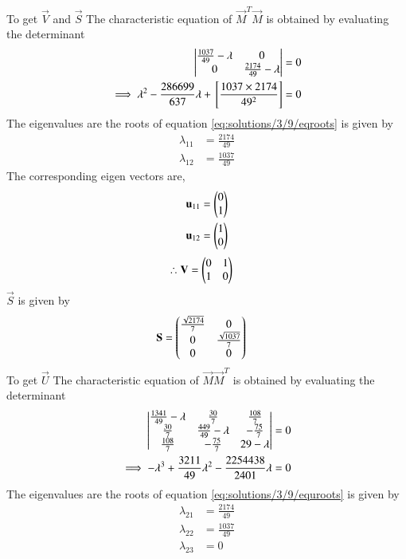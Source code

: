 {To get $\vec{V}$ and $\vec{S}$ }
The characteristic equation of $\vec{M}^T\vec{M}$ is obtained by evaluating the determinant 
\begin{align}
    \begin{vmatrix} \frac{1037}{49} - \lambda & 0\\ 0 & \frac{2174}{49} - \lambda\end{vmatrix} &= 0\\
	\implies \lambda^2 - \frac{286699}{637}\lambda + {}\left[\frac{1037 \times 2174}{49^2}\right] &=0\label{eq:solutions/3/9/eqroots}
\end{align}
The eigenvalues are the roots of equation \ref{eq:solutions/3/9/eqroots} is given by 
\begin{align}
	\lambda_{11}&= \frac{2174}{49} \label{eq:solutions/3/9/eqeig1}\\
	\lambda_{12}&=\frac{1037}{49} \label{eq:solutions/3/9/eqeig2}
\end{align}
The corresponding eigen vectors are, 
\begin{align}
	\mathbf{u}_{11} &=\begin{pmatrix}0 \\ 1\end{pmatrix}\\
	\mathbf{u}_{12} &=\begin{pmatrix}1 \\ 0\end{pmatrix}
\end{align}
\begin{align}
\therefore	\mathbf{V} &=\begin{pmatrix}0 & 1\\1 & 0\end{pmatrix}
\end{align}
$\vec{S}$ is given by 
\begin{align}
	\mathbf{S}&=\begin{pmatrix}\frac{\sqrt{2174}}{7} & 0\\ 0 & \frac{\sqrt{1037}}{7} \\ 0 &0\end{pmatrix}
\end{align}
{To get $\vec{U}$ }
The characteristic equation of $\vec{M}\vec{M}^T$ is obtained by evaluating the determinant 
\begin{align}
    \begin{vmatrix}\frac{1341}{49} - \lambda & \frac{30}{7} & \frac{108}{7}\\ \frac{30}{7} & \frac{449}{49} - \lambda & -\frac{75}{7} \\ \frac{108}{7} & -\frac{75}{7} & 29 - \lambda\end{vmatrix} &= 0\\
	\implies -\lambda^3 + \frac{3211}{49}\lambda^2 - \frac{2254438}{2401} \lambda &=0 \label{eq:solutions/3/9/equroots}
\end{align}
The eigenvalues are the roots of equation \ref{eq:solutions/3/9/equroots} is given by 
\begin{align}
	\lambda_{21}&= \frac{2174}{49} 
\\
	\lambda_{22}&= \frac{1037}{49}
\\
	\lambda_{23}&=0
\end{align}
